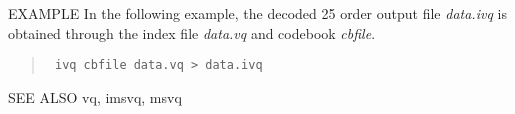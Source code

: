 \begin{options}
\end{options}

\begin{qsection}{EXAMPLE}
In the following example,
the decoded 25 order output file {\em data.ivq} is obtained
through the index file {\em data.vq} and codebook {\em cbfile}.
\begin{quote}
\verb! ivq cbfile data.vq > data.ivq !
\end{quote}
\end{qsection}

\begin{qsection}{SEE ALSO}
vq, imsvq, msvq
\end{qsection}
